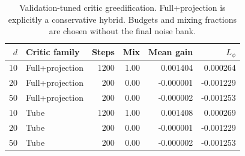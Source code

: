 \begin{table}[htbp]\centering\small\setlength{\tabcolsep}{4pt}
\caption{Validation-tuned critic greedification. Full+projection is explicitly a conservative hybrid. Budgets and mixing fractions are chosen without the final noise bank.}\label{tab:r11greedy}
\begin{tabular}{rlrrrr}\toprule
$d$ & Critic family & Steps & Mix & Mean gain & $L_\phi$\\\midrule
10 & Full+projection & 1200 & 1.00 & 0.001404 & 0.000264 \\
20 & Full+projection & 200 & 0.00 & -0.000001 & -0.001229 \\
50 & Full+projection & 200 & 0.00 & -0.000002 & -0.001253 \\
10 & Tube & 1200 & 1.00 & 0.001408 & 0.000269 \\
20 & Tube & 200 & 0.00 & -0.000001 & -0.001229 \\
50 & Tube & 200 & 0.00 & -0.000002 & -0.001253 \\
\bottomrule\end{tabular}\end{table}
